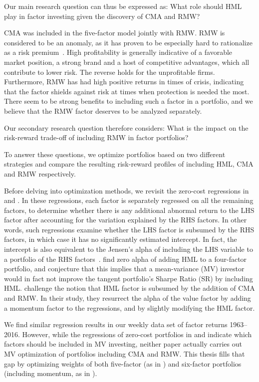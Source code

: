 Our main research question can thus be expressed as: What role should HML play in factor investing given the discovery of CMA and RMW?

CMA was included in the five-factor model jointly with RMW. RMW is considered to be an anomaly, as it has proven to be especially hard to rationalize as a risk premium~\autocite{Wang2013}. High profitability is generally indicative of a favorable market position, a strong brand and a host of competitive advantages, which all contribute to lower risk. The reverse holds for the unprofitable firms. Furthermore, RMW has had high positive returns in times of crisis, indicating that the factor shields against risk at times when protection is needed the most. There seem to be strong benefits to including such a factor in a portfolio, and we believe that the RMW factor deserves to be analyzed separately.

Our secondary research question therefore considers: What is the impact on the risk-reward trade-off of including RMW in factor portfolios? 

To answer these questions, we optimize portfolios based on two different strategies and compare the resulting risk-reward profiles of including HML, CMA and RMW respectively.

Before delving into optimization methods, we revisit the zero-cost regressions in \textcite{FF2015} and \textcite{Asness2015}. In these regressions, each factor is separately regressed on all the remaining factors, to determine whether there is any additional abnormal return to the LHS factor after accounting for the variation explained by the RHS factors. In other words, such regressions examine whether the LHS factor is subsumed by the RHS factors, in which case it has no significantly estimated intercept. In fact, the intercept is also equivalent to the Jensen's alpha of including the LHS variable to a portfolio of the RHS factors~\autocite{Jensen1968}. \textcite{FF2015} find zero alpha of adding HML to a four-factor portfolio, and conjecture that this implies that a mean-variance (MV) investor would in fact not improve the tangent portfolio's Sharpe Ratio (SR) by including HML. \textcite{Asness2015} challenge the notion that HML factor is subsumed by the addition of CMA and RMW. In their study, they resurrect the alpha of the value factor by adding a momentum factor to the regressions, and by slightly modifying the HML factor.

We find similar regression results in our weekly data set of factor returns 1963--2016. However, while the regressions of zero-cost portfolios in \textcite{FF2015} and \textcite{Asness2015} indicate which factors should be included in MV investing, neither paper actually carries out MV optimization of portfolios including CMA and RMW. This thesis fills that gap by optimizing weights of both five-factor (as in \textcite{FF2015}) and six-factor portfolios (including momentum, as in \textcite{Asness2015}). 

